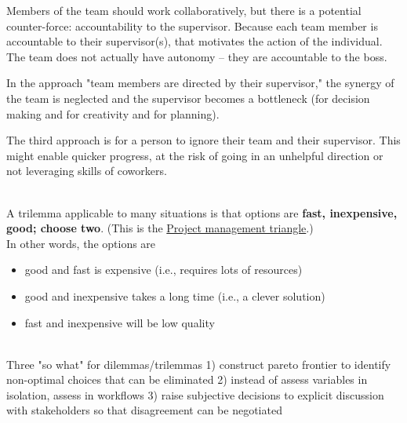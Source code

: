 Members of the team should work collaboratively, but there is a potential counter-force: accountability to the supervisor. Because each team member is accountable to their supervisor(s), that motivates the action of the individual. The team does not actually have autonomy -- they are accountable to the boss.

In the approach "team members are directed by their supervisor," the synergy of the team is neglected and the supervisor becomes a bottleneck (for decision making and for creativity and for planning).

The third approach is for a person to ignore their team and their supervisor. This might enable quicker progress, at the risk of going in an unhelpful direction or not leveraging skills of coworkers. 

\ \\

A trilemma applicable to many situations is that options are \textbf{fast, inexpensive, good; choose two}. (This is the \href{https://en.wikipedia.org/wiki/Project_management_triangle}{Project management triangle}.) \\
In other words, the options are
\begin{itemize}
    \item good and fast is expensive (i.e., requires lots of resources)
    \item good and inexpensive takes a long time (i.e., a clever solution)
    \item fast and inexpensive will be low quality
\end{itemize}

\ \\




Three "so what" for dilemmas/trilemmas
1) construct pareto frontier to identify non-optimal choices that can be eliminated
2) instead of assess variables in isolation, assess in workflows
3) raise subjective decisions to explicit discussion with stakeholders so that disagreement can be negotiated 



